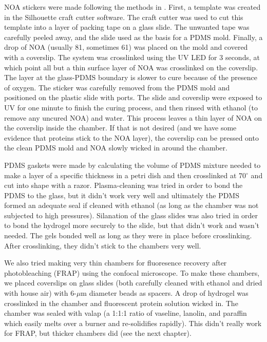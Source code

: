 NOA stickers were made following the methods in \cite{paustian13}.  First, a template was created in the Silhouette craft cutter software.  The craft cutter was used to cut this template into a layer of packing tape on a glass slide.  The unwanted tape was carefully peeled away, and the slide used as the basis for a PDMS mold.  Finally, a drop of NOA (usually 81, sometimes 61) was placed on the mold and covered with a coverslip.  The system was crosslinked using the UV LED for 3 seconds, at which point all but a thin surface layer of NOA was crosslinked on the coverslip.  The layer at the glass-PDMS boundary is slower to cure because of the presence of oxygen.  The sticker was carefully removed from the PDMS mold and positioned on the plastic slide with ports.  The slide and coverslip were exposed to UV for one minute to finish the curing process, and then rinsed with ethanol (to remove any uncured NOA) and water.  This process leaves a thin layer of NOA on the coverslip inside the chamber.  If that is not desired (and we have some evidence that proteins stick to the NOA layer), the coverslip can be pressed onto the clean PDMS mold and NOA slowly wicked in around the chamber.

PDMS gaskets were made by calculating the volume of PDMS mixture needed to make a layer of a specific thickness in a petri dish and then crosslinked at 70$^\circ$ and cut into shape with a razor.  Plasma-cleaning was tried in order to bond the PDMS to the glass, but it didn't work very well and ultimately the PDMS formed an adequate seal if cleaned with ethanol (as long as the chamber was not subjected to high pressures).  Silanation of the glass slides was also tried in order to bond the hydrogel more securely to the slide, but that didn't work and wasn't needed.  The gels bonded well as long as they were in place before crosslinking.  After crosslinking, they didn't stick to the chambers very well.

We also tried making very thin chambers for fluoresence recovery after photobleaching (FRAP) using the confocal microscope.  To make these chambers, we placed coverslips on glass slides (both carefully cleaned with ethanol and dried with house air) with 6-$\mu$m diameter beads as spacers.  A drop of hydrogel was crosslinked in the chamber and fluorescent protein solution wicked in.  The chamber was sealed with valap (a 1:1:1 ratio of vaseline, lanolin, and paraffin which easily melts over a burner and re-solidifies rapidly).  This didn't really work for FRAP, but thicker chambers did (see the next chapter).

